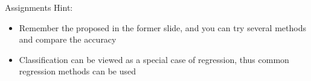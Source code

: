 \documentclass{../TexTemplate/myslide}
\begin{document}
\begin{frame}{Assignments}
Hint:
\begin{itemize}
	\item Remember the proposed \hyperlink{hint}{} in the former slide, and you can try several methods and compare the accuracy
	\item Classification can be viewed as a special case of regression, thus common regression methods can be used
\end{itemize}
\end{frame}
\end{document}
